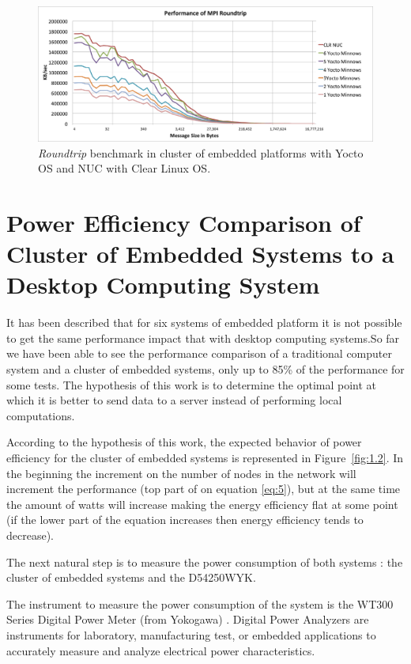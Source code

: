\begin{figure}
  \includegraphics[width=\paperwidth]{images/mpbench_cluster_experiments/mpi_roundtrip.png}
\caption{\textit{Roundtrip} benchmark in cluster of embedded platforms with Yocto OS and NUC
with Clear Linux OS.}
\label{roundtrip_cluster}
\end{figure}

\section{Power Efficiency Comparison of Cluster of Embedded Systems to a
Desktop Computing System}

It has been described that for six systems of embedded platform it is not
possible to get the same performance impact that with desktop computing
systems.So far we have been able to see the performance comparison of a traditional
computer system and a cluster of embedded systems, only up to 85\% of the
performance for some tests. The hypothesis of this work is to determine the
optimal point at which it is better to send data to a server instead of
performing local computations.


According to the hypothesis of this work, the expected behavior of power
efficiency for the cluster of embedded systems is represented in
Figure~\ref{fig:1.2}. In the beginning the increment on the
number of nodes in the network will increment the performance (top part of
on equation \ref{eq:5}), but at the same time the amount of watts will
increase making the energy efficiency flat at some point (if the lower part of
the equation increases then energy efficiency tends to decrease).

The next natural step is to measure the power consumption of both systems : the
cluster of embedded systems and the D54250WYK.

The instrument to measure the power consumption of the system is the WT300
Series Digital Power Meter (from Yokogawa) . Digital Power Analyzers are
instruments for laboratory, manufacturing test, or embedded applications to
accurately measure and analyze electrical power characteristics.

